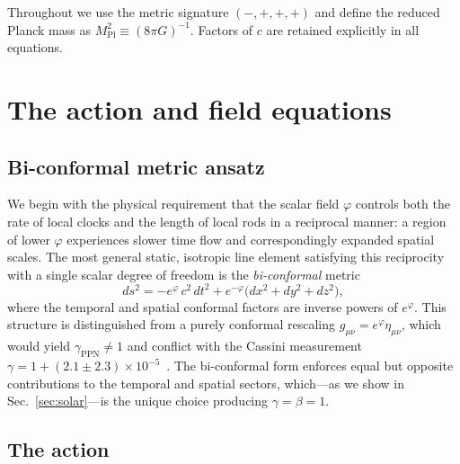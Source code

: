 \documentclass[aps,prd,onecolumn,superscriptaddress,nofootinbib,showpacs,12pt]{revtex4-2}
\newcommand{\Mpl}{M_{\mathrm{Pl}}}
\begin{document}
Throughout we use the metric signature $(-,+,+,+)$
and define the reduced Planck mass as
$\Mpl^{2} \equiv (8\pi G)^{-1}$.
Factors of $c$ are retained explicitly in all equations.

\section{The action and field equations}\label{sec:action}

\subsection{Bi-conformal metric ansatz}\label{sec:biconformal}

We begin with the physical requirement that the scalar field
$\varphi$ controls both the rate of local clocks and the
length of local rods in a reciprocal manner: a region of
lower $\varphi$ experiences slower time flow and
correspondingly expanded spatial scales.  The most general
static, isotropic line element satisfying this reciprocity
with a single scalar degree of freedom is the
\emph{bi-conformal} metric
\begin{equation}\label{eq:metric}
  ds^{2} = -e^{\varphi}\,c^{2}\,dt^{2}
           + e^{-\varphi}\bigl(dx^{2}+dy^{2}+dz^{2}\bigr),
\end{equation}
where the temporal and spatial conformal factors are inverse
powers of $e^{\varphi}$.  This structure is distinguished from
a purely conformal rescaling $g_{\mu\nu} = e^{\varphi}\eta_{\mu\nu}$,
which would yield $\gamma_{\mathrm{PPN}} \neq 1$ and conflict
with the Cassini measurement
$\gamma = 1 + (2.1 \pm 2.3) \times 10^{-5}$~\cite{Bertotti2003}.  The bi-conformal form
enforces equal but opposite contributions to the temporal
and spatial sectors, which---as we show in
Sec.~\ref{sec:solar}---is the unique choice producing
$\gamma = \beta = 1$.

\subsection{The action}\label{sec:action_derivation}
\end{document}
